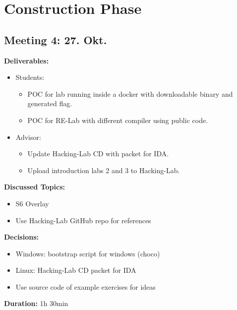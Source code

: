 \newpage
\section*{Construction Phase}
\subsection*{Meeting 4: 27. Okt.}
\textbf{Deliverables:} 
\begin{itemize}
    \item Students:
    \begin{itemize}
        \item POC for lab running inside a docker with downloadable binary and generated flag.
        \item POC for RE-Lab with different compiler using public code.
    \end{itemize}
    \item Advisor:
    \begin{itemize}
        \item Update Hacking-Lab CD with packet for IDA.
        \item Upload introduction labs 2 and 3 to Hacking-Lab.
    \end{itemize}
\end{itemize}
\textbf{Discussed Topics:} 
\begin{itemize}
    \item S6 Overlay
    \item Use Hacking-Lab GitHub repo for references
\end{itemize}
\textbf{Decisions:} 
\begin{itemize}
    \item Windows: bootstrap script for windows (choco)
    \item Linux: Hacking-Lab CD packet for IDA
    \item Use source code of example exercises for ideas
\end{itemize}
\textbf{Duration:} 1h 30min

\newpage

